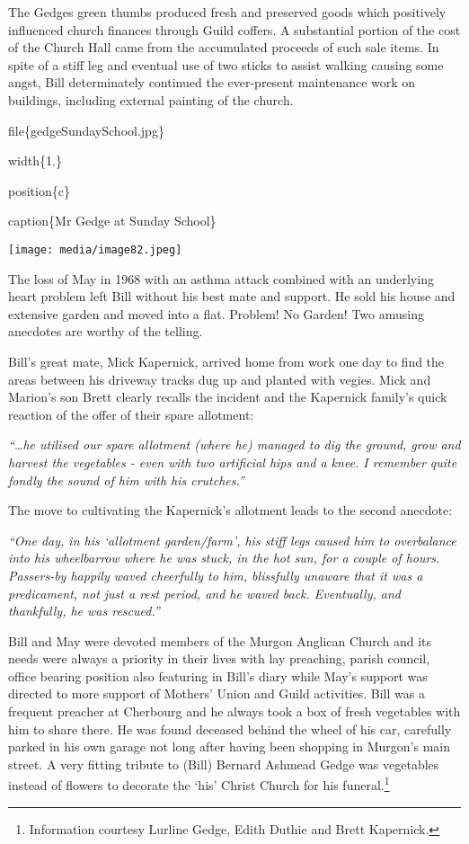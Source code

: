 The Gedges green thumbs produced fresh and preserved goods which positively influenced church finances through Guild coffers. A substantial portion of the cost of the Church Hall came from the accumulated proceeds of such sale items. In spite of a stiff leg and eventual use of two sticks to assist walking causing some angst, Bill determinately continued the ever-present maintenance work on buildings, including external painting of the church.

file\{gedgeSundaySchool.jpg\}

width\{1.\}

position\{c\}

caption\{Mr Gedge at Sunday School\}

\texttt{[image: media/image82.jpeg]}

The loss of May in 1968 with an asthma attack combined with an underlying heart problem left Bill without his best mate and support. He sold his house and extensive garden and moved into a flat. Problem! No Garden! Two amusing anecdotes are worthy of the telling.

Bill's great mate, Mick Kapernick, arrived home from work one day to find the areas between his driveway tracks dug up and planted with vegies. Mick and Marion's son Brett clearly recalls the incident and the Kapernick family's quick reaction of the offer of their spare allotment:

\emph{``\ldots he utilised our spare allotment (where he) managed to dig the ground, grow and harvest the vegetables - even with two artificial hips and a knee. I remember quite fondly the sound of him with his crutches.''}

The move to cultivating the Kapernick's allotment leads to the second anecdote:

\emph{``One day, in his `allotment garden/farm', his stiff legs caused him to overbalance into his wheelbarrow where he was stuck, in the hot sun, for a couple of hours. Passers-by happily waved cheerfully to him, blissfully unaware that it was a predicament, not just a rest period, and he waved back. Eventually, and thankfully, he was rescued.''}

Bill and May were devoted members of the Murgon Anglican Church and its needs were always a priority in their lives with lay preaching, parish council, office bearing position also featuring in Bill's diary while May's support was directed to more support of Mothers' Union and Guild activities. Bill was a frequent preacher at Cherbourg and he always took a box of fresh vegetables with him to share there. He was found deceased behind the wheel of his car, carefully parked in his own garage not long after having been shopping in Murgon's main street. A very fitting tribute to (Bill) Bernard Ashmead Gedge was vegetables instead of flowers to decorate the `his' Christ Church for his funeral.\footnote{Information courtesy Lurline Gedge, Edith Duthie and Brett Kapernick.}

